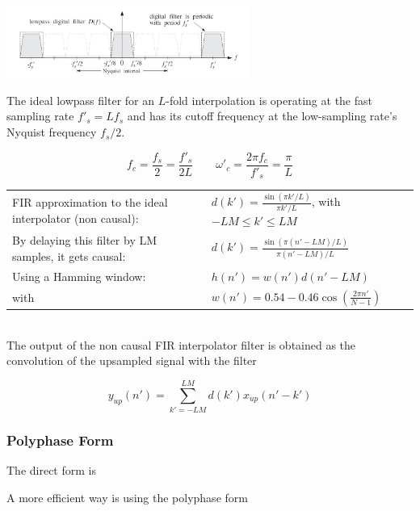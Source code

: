 \begin{center}
	\includegraphics[width=8cm]{images/IntDecOv_Filter.jpg}
\end{center}

The ideal lowpass filter for an $L$-fold interpolation is operating at the fast
sampling rate $f'_s=L f_s$ and has its cutoff frequency at the low-sampling
rate's Nyquist frequency $f_s/2$.

\begin{equation*}
	f_c = \frac{f_s}{2}=\frac{f'_s}{2L}
	\qquad
	\omega'_c = \frac{2\pi f_c}{f'_s}=\frac{\pi}{L}
\end{equation*}

\begin{tabularx}{\linewidth}{Xl}
	FIR approximation to the ideal interpolator (non causal):
	& $d(k')=\frac{\sin(\pi k'/L)}{\pi k'/L}$, with $-LM\leq k'\leq LM$\\
	By delaying this filter by LM samples, it gets causal: 
	& $d(k')=\frac{\sin(\pi (n'-LM)/L)}{\pi (n'-LM)/L}$ \\
	Using a Hamming window: & $h(n')=w(n')d(n'-LM)$ \\
	with & $w(n') = 0.54-0.46\cos(\frac{2\pi n'}{N-1})$ \\
\end{tabularx} \\

The output of the non causal FIR interpolator filter is obtained as the
convolution of the upsampled signal with the filter 

\begin{equation*}
	y_{up}(n') = \sum\limits_{k'=-LM}^{LM}d(k')x_{up}(n'-k')
\end{equation*}


\subsubsection{Polyphase Form}

\begin{multicols}{2}
	The direct form is
	\begin{center}
	\end{center}
\vfill\columnbreak
	A more efficient way is using the polyphase form
	\begin{center}
	\end{center}
\end{multicols}


